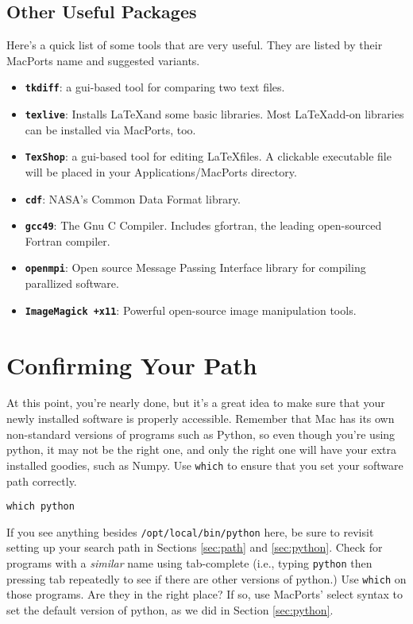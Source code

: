 \documentclass[12pt, letterpaper]{article}
\begin{document}
\subsection{Other Useful Packages}
Here's a quick list of some tools that are very useful.  They are listed by
their MacPorts name and suggested variants.
\begin{itemize}
  \item \textbf{\tt tkdiff}: a gui-based tool for comparing two text files.
  \item \textbf{\tt texlive}: Installs \LaTeX and some basic libraries.
    Most \LaTeX add-on libraries can be installed via MacPorts, too.
  \item \textbf{\tt TexShop}: a gui-based tool for editing \LaTeX files.  A
    clickable executable file will be placed in your Applications/MacPorts
    directory.
  \item \textbf{\tt cdf}: NASA's Common Data Format library.
  \item \textbf{\tt gcc49}: The Gnu C Compiler.  Includes gfortran, the leading
    open-sourced Fortran compiler.
  \item \textbf{\tt openmpi}: Open source Message Passing Interface library for
    compiling parallized software.
  \item \textbf{\tt ImageMagick +x11}: Powerful open-source image manipulation
    tools.
\end{itemize}

\section{Confirming Your Path}
At this point, you're nearly done, but it's a great idea to make sure that
your newly installed software is properly accessible. Remember that Mac has
its own non-standard versions of programs such as Python, so even though you're
using python, it may not be the right one, and only the right one will have
your extra installed goodies, such as Numpy.  Use {\tt which} to
ensure that you set your software path correctly.
\begin{verbatim}
which python
\end{verbatim}
If you see anything besides {\tt /opt/local/bin/python} here, be sure to
revisit setting up your search path in Sections \ref{sec:path} and
\ref{sec:python}.   Check for programs with a \emph{similar} name using
tab-complete (i.e., typing {\tt python} then pressing tab repeatedly to see
if there are other versions of python.)  Use {\tt which} on those programs.
Are they in the right place?  If so, use MacPorts' select syntax to set the
default version of python, as we did in Section \ref{sec:python}.
\end{document}
